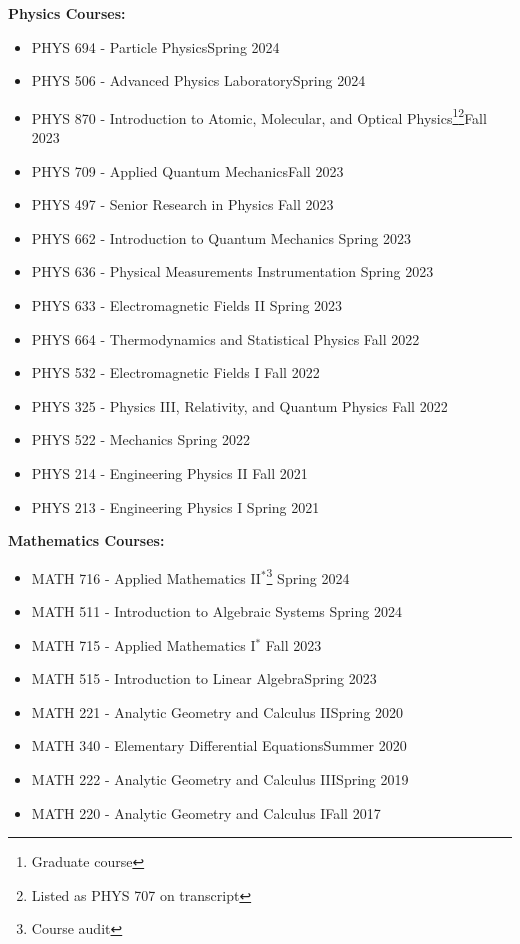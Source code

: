 \documentclass{article}
\begin{document}
\textbf{Physics Courses:}\begin{itemize}
	\item PHYS 694 - Particle Physics\hfill Spring 2024
	\item PHYS 506 - Advanced Physics Laboratory\hfill Spring 2024
	\item PHYS 870 - Introduction to Atomic, Molecular, and Optical Physics\footnote[1]{Graduate course}\footnote[2]{Listed as PHYS 707 on transcript}\hfill Fall 2023
	\item PHYS 709 - Applied Quantum Mechanics\hfill Fall 2023
	\item PHYS 497 - Senior Research in Physics \hfill Fall 2023
	\item PHYS 662 - Introduction to Quantum Mechanics \hfill Spring 2023
	\item PHYS 636 - Physical Measurements Instrumentation \hfill Spring 2023
	\item PHYS 633 - Electromagnetic Fields II \hfill Spring 2023
	\item PHYS 664 - Thermodynamics and Statistical Physics \hfill Fall 2022
	\item PHYS 532 - Electromagnetic Fields I \hfill Fall 2022
	\item PHYS 325 - Physics III, Relativity, and Quantum Physics \hfill Fall 2022
	\item PHYS 522 - Mechanics \hfill Spring 2022
	\item PHYS 214 - Engineering Physics II \hfill Fall 2021
	\item PHYS 213 - Engineering Physics I \hfill Spring 2021\\[-12pt]
\end{itemize}
\textbf{Mathematics Courses:}
\begin{itemize}
	\item MATH 716 - Applied Mathematics II$ ^* $\footnote[3]{Course audit} \hfill Spring 2024
	\item MATH 511 - Introduction to Algebraic Systems \hfill Spring 2024
	\item MATH 715 - Applied Mathematics I$ ^* $ \hfill Fall 2023
	\item MATH 515 - Introduction to Linear Algebra\hfill Spring 2023
	\item MATH 221 - Analytic Geometry and Calculus II\hfill Spring 2020
	\item MATH 340 - Elementary Differential Equations\hfill Summer 2020
	\item MATH 222 - Analytic Geometry and Calculus III\hfill Spring 2019
	\item MATH 220 - Analytic Geometry and Calculus I\hfill Fall 2017\\[-12pt]
\end{itemize}
\end{document}
